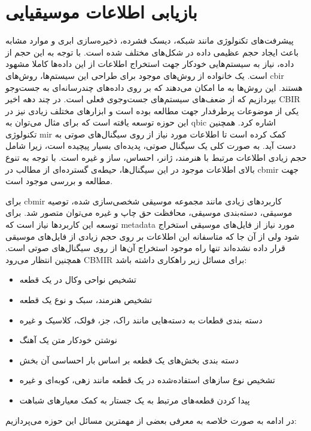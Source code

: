 \section{بازیابی اطلاعات موسیقیایی}
پیشرفت‌های تکنولوژی مانند شبکه، دیسک فشرده، ذخیره‌سازی ابری و موارد مشابه باعث
ایجاد حجم عظیمی داده در شکل‌های مختلف شده است. با توجه به این حجم از داده، نیاز
به سیستم‌هایی خودکار جهت استخراج اطلاعات از این داده‌ها کاملا مشهود است. یک
خانواده از روش‌های موجود برای طراحی این سیستم‌ها، روش‌های \gls{cbir} هستند. این
روش‌ها به ما امکان می‌دهند که بر روی داده‌های چندرسانه‌ای به جست‌وجو بپردازیم که
از ضعف‌های سیستم‌های جست‌وجوی فعلی است. در چند دهه اخیر \gls{CBIR} یکی از
موضوعات پرطرفدار جهت مطالعه بوده است و ابزارهای مختلف زیادی نیز در این حوزه
توسعه یافته است که برای مثال می‌توان به \gls{qbic} اشاره کرد. همچنین تکنولوژی
\gls{mir} کمک کرده است تا اطلاعات مورد نیاز از روی سیگنال‌های صوتی به دست آید.
به صورت کلی یک سیگنال صوتی، پدیده‌ای بسیار پیچیده است، زیرا شامل حجم زیادی
اطلاعات مرتبط با هنرمند، ژانر، احساس، ساز و غیره است. با توجه به تنوع بالای
اطلاعات موجود در این سیگنال‌ها، حیطه‌ی گسترده‌ای از مطالب در \gls{cbmir} جهت
مطالعه و بررسی موجود است.

برای \gls{cbmir} کاربردهای زیادی مانند مجموعه موسیقی شخصی‌سازی شده، توصیه
موسیقی، دسته‌بندی موسیقی، محافظت حق چاپ و غیره می‌توان متصور شد. برای توسعه این
کاربردها نیاز است که \gls{metadata} مورد نیاز از فایل‌های موسیقی استخراج شود ولی
از آن جا که متاسفانه این اطلاعات بر روی حجم زیادی از فایل‌های موسیقی قرار داده
نشده‌اند تنها راه موجود استخراج آن‌ها از روی سیگنال‌های صوتی است. همچنین انتظار
می‌رود \gls{CBMIR} برای مسائل زیر راهکاری داشته باشد:
\begin{itemize}
    \item تشخیص نواحی وکال در یک قطعه
    \item تشخیص هنرمند، سبک و نوع یک قطعه
    \item دسته بندی قطعات به دسته‌هایی مانند راک، جز، فولک، کلاسیک و غیره
    \item نوشتن خودکار متن یک آهنگ
    \item دسته بندی بخش‌های یک قطعه بر اساس بار احساسی آن بخش
    \item تشخیص نوع سازهای استفاده‌شده در یک قطعه مانند زهی، کوبه‌ای و غیره
    \item پیدا کردن قطعه‌های مرتبط به یک جستار به کمک معیارهای شباهت	
\end{itemize}

در ادامه به صورت خلاصه به معرفی بعضی از مهمترین مسائل این حوزه می‌پردازیم:

